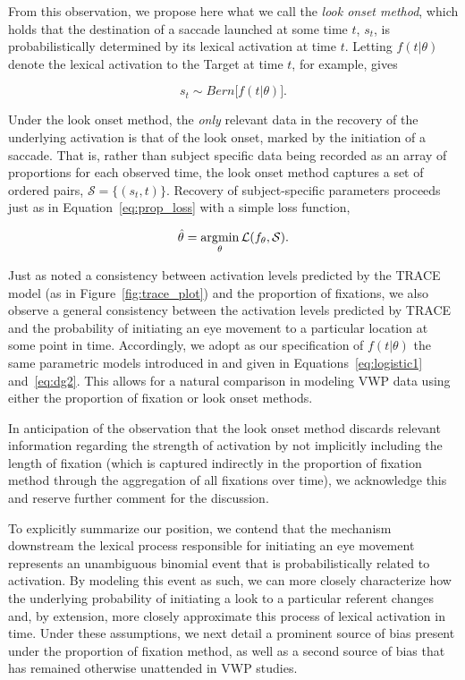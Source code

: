 From this observation, we propose here what we call the \textit{look onset method}, which holds that the destination of a saccade launched at some time $t$, $s_t$, is probabilistically determined by its lexical activation at time $t$. Letting $f(t|\theta)$ denote the lexical activation to the Target at time $t$, for example, gives

\begin{equation}\label{eq:onset_distribution}
s_t \sim Bern \big[ f( t  |  \theta) \big].
\end{equation}

Under the look onset method, the \textit{only} relevant data in the recovery of the underlying activation is that of the look onset, marked by the initiation of a saccade. That is, rather than subject specific data being recorded as an array of proportions for each observed time, the look onset method captures a set of ordered pairs, $\mathcal{S} = \{(s_t, t)\}$. Recovery of subject-specific parameters proceeds just as in Equation~\ref{eq:prop_loss} with  a simple loss function,

\begin{equation}
\hat{\theta} = \operatorname*{arg\!\min}_{\theta} \mathcal{L}(f_{\theta}, \mathcal{S}).
\end{equation}


Just as \citet{allopenna1998tracking} noted a consistency between activation levels predicted by the TRACE model (as in Figure~\ref{fig:trace_plot}) and the proportion of fixations, we also observe a general consistency between the activation levels predicted by TRACE and the probability of initiating an eye movement to a particular location at some point in time. Accordingly, we adopt as our specification of $f(t|\theta)$ the same parametric models introduced in \citet{mcmurray2010individual} and given in Equations~\ref{eq:logistic1} and~\ref{eq:dg2}. This allows for a natural comparison in modeling VWP data using either the proportion of fixation or look onset methods.

In anticipation of the observation that the look onset method discards relevant information regarding the strength of activation by not implicitly including the length of fixation (which is captured indirectly in the proportion of fixation method through the aggregation of all fixations over time), we acknowledge this and reserve further comment for the discussion.

To explicitly summarize our position, we contend that the mechanism downstream the lexical process responsible for initiating an eye movement represents an unambiguous binomial event that is probabilistically related to activation. By modeling this event as such, we can more closely characterize how the underlying probability of initiating a look to a particular referent changes and, by extension, more closely approximate this process of lexical activation in time. Under these assumptions, we next detail a prominent source of bias present under the proportion of fixation method, as well as a second source of bias that has remained otherwise unattended in VWP studies. 

